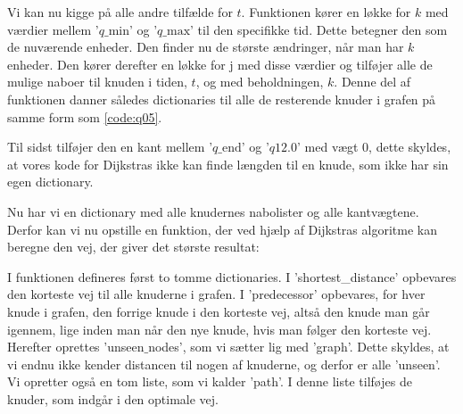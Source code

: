 Vi kan nu kigge på alle andre tilfælde for $t$. Funktionen kører en løkke for $k$ med værdier mellem '$q\textrm{\_min}$' og '$q\textrm{\_max}$' til den specifikke tid. Dette betegner den som de nuværende enheder.
Den finder nu de største ændringer, når man har $k$ enheder. Den kører derefter en løkke for $\textrm{j}$ med disse værdier og tilføjer alle de mulige naboer til knuden i tiden, $t$, og med beholdningen, $k$. Denne del af funktionen danner således dictionaries til alle de resterende knuder i grafen på samme form som \autoref{code:q05}.

Til sidst tilføjer den en kant mellem '$q\textrm{\_end}$' og '$q12.0$' med vægt $0$, dette skyldes, at vores kode for Dijkstras ikke kan finde længden til en knude, som ikke har sin egen dictionary.

Nu har vi en dictionary med alle knudernes nabolister og alle kantvægtene. Derfor kan vi nu opstille en funktion, der ved hjælp af Dijkstras algoritme kan beregne den vej, der giver det største resultat:



I funktionen defineres først to tomme dictionaries. I 'shortest\_distance' opbevares den korteste vej til alle knuderne i grafen. I 'predecessor' opbevares, for hver knude i grafen, den forrige knude i den korteste vej, altså den knude man går igennem, lige inden man når den nye knude, hvis man følger den korteste vej. Herefter oprettes 'unseen$\_$nodes', som vi sætter lig med 'graph'. Dette skyldes, at vi endnu ikke kender distancen til nogen af knuderne, og derfor er alle 'unseen'. Vi opretter også en tom liste, som vi kalder 'path'. I denne liste tilføjes de knuder, som indgår i den optimale vej.

